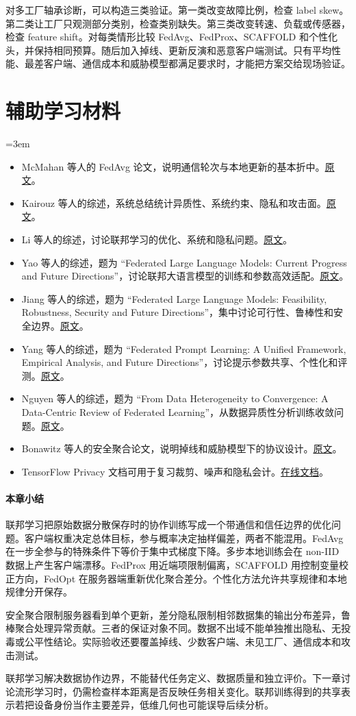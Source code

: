 对多工厂轴承诊断，可以构造三类验证。第一类改变故障比例，检查 label skew。第二类让工厂只观测部分类别，检查类别缺失。第三类改变转速、负载或传感器，检查 feature shift。对每类情形比较 FedAvg、FedProx、SCAFFOLD 和个性化头，并保持相同预算。随后加入掉线、更新反演和恶意客户端测试。只有平均性能、最差客户端、通信成本和威胁模型都满足要求时，才能把方案交给现场验证。

\section*{辅助学习材料}
\begingroup
\emergencystretch=3em
\begin{itemize}
\item McMahan 等人的 FedAvg 论文，说明通信轮次与本地更新的基本折中。\href{https://arxiv.org/abs/1602.05629}{原文}。
\item Kairouz 等人的综述，系统总结统计异质性、系统约束、隐私和攻击面。\href{https://arxiv.org/abs/1912.04977}{原文}。
\item Li 等人的综述，讨论联邦学习的优化、系统和隐私问题。\href{https://arxiv.org/abs/2007.07213}{原文}。
\item Yao 等人的综述，题为 ``Federated Large Language Models: Current Progress and Future Directions''，讨论联邦大语言模型的训练和参数高效适配。\href{https://arxiv.org/abs/2409.15723}{原文}。
\item Jiang 等人的综述，题为 ``Federated Large Language Models: Feasibility, Robustness, Security and Future Directions''，集中讨论可行性、鲁棒性和安全边界。\href{https://arxiv.org/abs/2505.08830}{原文}。
\item Yang 等人的综述，题为 ``Federated Prompt Learning: A Unified Framework, Empirical Analysis, and Future Directions''，讨论提示参数共享、个性化和评测。\href{https://arxiv.org/abs/2608.13844}{原文}。
\item Nguyen 等人的综述，题为 ``From Data Heterogeneity to Convergence: A Data-Centric Review of Federated Learning''，从数据异质性分析训练收敛问题。\href{https://arxiv.org/abs/2606.10595}{原文}。
\item Bonawitz 等人的安全聚合论文，说明掉线和威胁模型下的协议设计。\href{https://arxiv.org/abs/1611.04482}{原文}。
\item TensorFlow Privacy 文档可用于复习裁剪、噪声和隐私会计。\href{https://tensorflow.google.cn/responsible_ai/privacy}{在线文档}。
\end{itemize}
\endgroup

\paragraph{本章小结}
联邦学习把原始数据分散保存时的协作训练写成一个带通信和信任边界的优化问题。客户端权重决定总体目标，参与概率决定抽样偏差，两者不能混用。FedAvg 在一步全参与的特殊条件下等价于集中式梯度下降。多步本地训练会在 non-IID 数据上产生客户端漂移。FedProx 用近端项限制偏离，SCAFFOLD 用控制变量校正方向，FedOpt 在服务器端重新优化聚合差分。个性化方法允许共享规律和本地规律分开保存。

安全聚合限制服务器看到单个更新，差分隐私限制相邻数据集的输出分布差异，鲁棒聚合处理异常贡献。三者的保证对象不同。数据不出域不能单独推出隐私、无投毒或公平性结论。实际验收还要覆盖掉线、少数客户端、未见工厂、通信成本和攻击测试。

联邦学习解决数据协作边界，不能替代任务定义、数据质量和独立评价。下一章讨论流形学习时，仍需检查样本距离是否反映任务相关变化。联邦训练得到的共享表示若把设备身份当作主要差异，低维几何也可能误导后续分析。
